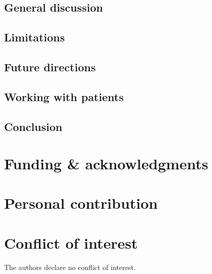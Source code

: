 \section{General discussion}
\section{Limitations}
\section{Future directions}
\section{Working with patients}
\section{Conclusion}



\backmatter
\chapter{Funding \& acknowledgments}
\lipsum[1]
\chapter{Personal contribution}
\lipsum[2]
\chapter{Conflict of interest}
The authors declare no conflict of interest.


